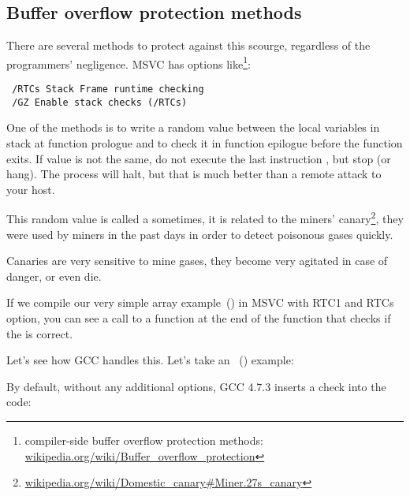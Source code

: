 \subsection{Buffer overflow protection methods}
\label{subsec:BO_protection}

There are several methods to protect against this scourge, regardless of the \CCpp programmers' negligence.
MSVC has options like\footnote{compiler-side buffer overflow protection methods:
\href{http://go.yurichev.com/17133}{wikipedia.org/wiki/Buffer\_overflow\_protection}}:

\begin{lstlisting}
 /RTCs Stack Frame runtime checking
 /GZ Enable stack checks (/RTCs)
\end{lstlisting}


One of the methods is to write a random value between the local variables in stack at function prologue 
and to check it in function epilogue before the function exits.
If value is not the same, do not execute the last instruction \RET, but stop (or hang).
The process will halt, but that is much better than a remote attack to your host.
    
\newcommand{\CANARYURL}{\href{http://go.yurichev.com/17134}{wikipedia.org/wiki/Domestic\_canary\#Miner.27s\_canary}}


This random value is called a  sometimes, it is related to the miners' canary\footnote{\CANARYURL},
they were used by miners in the past days in order to detect poisonous gases quickly.

Canaries are very sensitive to mine gases, they become very agitated in case of danger, or even die.

If we compile our very simple array example~() in \ac{MSVC}
with RTC1 and RTCs option, you can see a call to
 a function at the end of the function that checks if the  is correct.

Let's see how GCC handles this. 
Let's take an ~() example:



By default, without any additional options, GCC 4.7.3 inserts a  check into the code:



